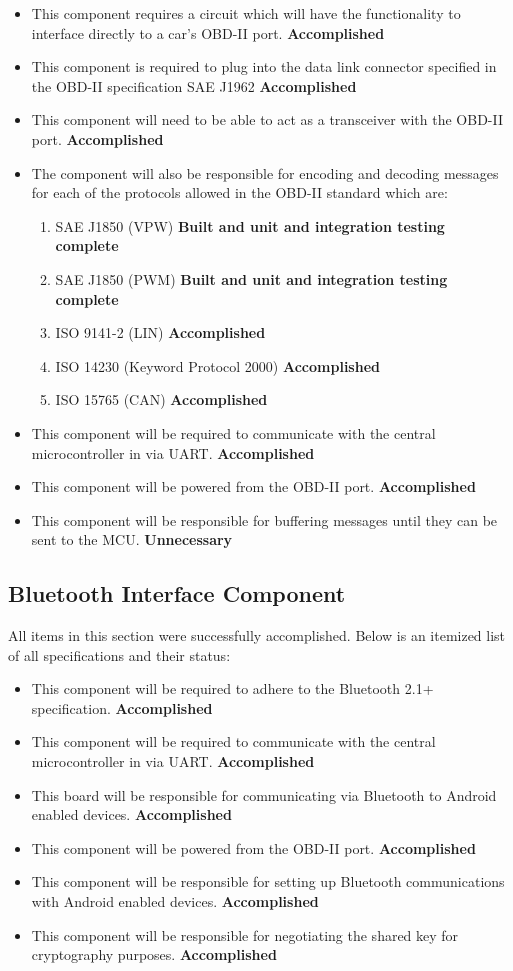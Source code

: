 \documentclass[12pt,letterpaper]{article}
\begin{document}
\begin{itemize}
	\item This component requires a circuit which will have the functionality to interface directly to a car's OBD-II port. \textbf{Accomplished}
	\item This component is required to plug into the data link connector specified in the OBD-II specification SAE J1962 \textbf{Accomplished}
	\item This component will need to be able to act as a transceiver with the OBD-II port. \textbf{Accomplished}
	\item The component will also be responsible for encoding and decoding messages for each of the protocols allowed in the OBD-II standard which are: 
	\begin{enumerate}
		\item SAE J1850 (VPW) \textbf{Built and unit and integration testing complete}
		\item SAE J1850 (PWM) \textbf{Built and unit and integration testing complete}
		\item ISO 9141-2 (LIN) \textbf{Accomplished}
		\item ISO 14230 (Keyword Protocol 2000) \textbf{Accomplished}
		\item ISO 15765 (CAN) \textbf{Accomplished}
	\end{enumerate}
	\item This component will be required to communicate with the central microcontroller in via UART. \textbf{Accomplished}
	\item This component will be powered from the OBD-II port. \textbf{Accomplished}
	\item This component will be responsible for buffering messages until they can be sent to the MCU. \textbf{Unnecessary}
\end{itemize}

\subsection{Bluetooth Interface Component}
All items in this section were successfully accomplished. Below is an itemized list of all specifications and their status:

\begin{itemize}
	\item This component will be required to adhere to the Bluetooth 2.1+ specification. \textbf{Accomplished}
	\item This component will be required to communicate with the central microcontroller in via UART. \textbf{Accomplished}
	\item This board will be responsible for communicating via Bluetooth to Android enabled devices. \textbf{Accomplished}
	\item This component will be powered from the OBD-II port. \textbf{Accomplished}
	\item This component will be responsible for setting up Bluetooth communications with Android enabled devices. \textbf{Accomplished}
	\item This component will be responsible for negotiating the shared key for cryptography purposes. \textbf{Accomplished}
\end{itemize}
\end{document}
